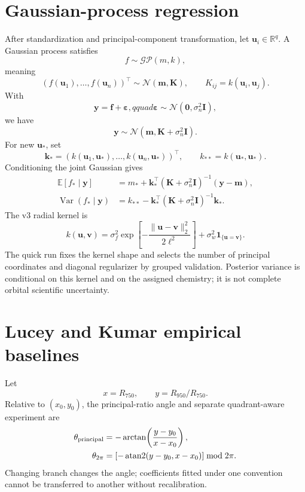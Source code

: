 \documentclass[11pt]{article}
\newcommand{\R}{\mathbb{R}}
\newcommand{\E}{\mathbb{E}}
\newcommand{\Var}{\operatorname{Var}}
\begin{document}
\section{Gaussian-process regression}
After standardization and principal-component transformation, let $\bm u_i\in\R^q$. A Gaussian process satisfies
\begin{equation}
 f\sim\mathcal{GP}(m,k),
\end{equation}
meaning
\begin{equation}
 (f(\bm u_1),\ldots,f(\bm u_n))^\top\sim\mathcal N(\bm m,\bm K),
 \qquad K_{ij}=k(\bm u_i,\bm u_j).
\end{equation}
With
\begin{equation}
 \bm y=\bm f+\bm\varepsilon,qquad
 \bm\varepsilon\sim\mathcal N(\bm0,\sigma_n^2\bm I),
\end{equation}
we have
\begin{equation}
 \bm y\sim\mathcal N(\bm m,\bm K+\sigma_n^2\bm I).
\end{equation}
For new $\bm u_*$, set
\begin{equation}
 \bm k_*=(k(\bm u_1,\bm u_*),\ldots,k(\bm u_n,\bm u_*))^\top,
 \qquad k_{**}=k(\bm u_*,\bm u_*).
\end{equation}
Conditioning the joint Gaussian gives
\begin{align}
 \E[f_*\mid\bm y]
 &=m_*+\bm k_*^\top(\bm K+\sigma_n^2\bm I)^{-1}(\bm y-\bm m),\\
 \Var(f_*\mid\bm y)
 &=k_{**}-\bm k_*^\top(\bm K+\sigma_n^2\bm I)^{-1}\bm k_*.
\end{align}
The v3 radial kernel is
\begin{equation}
 k(\bm u,\bm v)=\sigma_f^2
 \exp\!\left[-\frac{\|\bm u-\bm v\|_2^2}{2\ell^2}\right]
 +\sigma_w^2\mathbf1_{\{\bm u=\bm v\}}.
\end{equation}
The quick run fixes the kernel shape and selects the number of principal coordinates and diagonal regularizer by grouped validation. Posterior variance is conditional on this kernel and on the assigned chemistry; it is not complete orbital scientific uncertainty.

\section{Lucey and Kumar empirical baselines}
Let
\begin{equation}
 x=R_{750},\qquad y=R_{950}/R_{750}.
\end{equation}
Relative to $(x_0,y_0)$, the principal-ratio angle and separate quadrant-aware experiment are
\begin{align}
 \theta_{\rm principal}&=-\arctan\!\left(\frac{y-y_0}{x-x_0}\right),\\
 \theta_{2\pi}&=[-\operatorname{atan2}(y-y_0,x-x_0)]\bmod2\pi.
\end{align}
Changing branch changes the angle; coefficients fitted under one convention cannot be transferred to another without recalibration.
\end{document}
